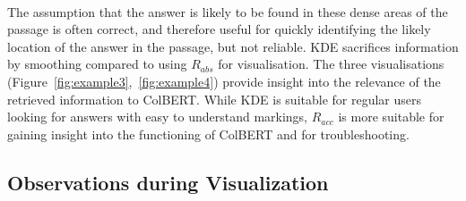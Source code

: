 \documentclass[11pt]{article}
\begin{document}
\\
The assumption that the answer is likely to be found in these dense areas of the passage is often correct, and therefore useful for quickly identifying the likely location of the answer in the passage, but not reliable. 
KDE sacrifices information by smoothing compared to using $R_{abs}$ for visualisation. The three visualisations (Figure~\ref{fig:example3},~\ref{fig:example4}) provide insight into the relevance of the retrieved information to ColBERT.
While KDE is suitable for regular users looking for answers with easy to understand markings, $R_{acc}$ is more suitable for gaining insight into the functioning of ColBERT and for troubleshooting.


\subsection{Observations during Visualization}
\label{chap:observations}
\end{document}
